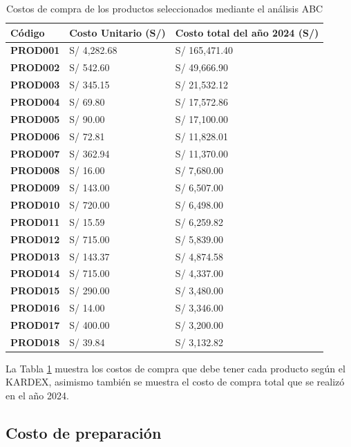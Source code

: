 \newpage
\begin{table}[H]
    \caption{Costos de compra de los productos seleccionados mediante el análisis ABC}
    \begin{tabular}{p{2cm} p{5cm} p{6.5cm}} %
        \hline
        \textbf{Código} & \textbf{Costo Unitario (S/)} & \textbf{Costo total del año 2024 (S/)} \\
        \hline
        \textbf{PROD001} & S/ 4,282.68 & S/ 165,471.40 \\
        \textbf{PROD002} & S/ 542.60 & S/ 49,666.90 \\
        \textbf{PROD003} & S/ 345.15 & S/ 21,532.12 \\
        \textbf{PROD004} & S/ 69.80 & S/ 17,572.86 \\
        \textbf{PROD005} & S/ 90.00 & S/ 17,100.00 \\
        \textbf{PROD006} & S/ 72.81 & S/ 11,828.01 \\
        \textbf{PROD007} & S/ 362.94 & S/ 11,370.00 \\
        \textbf{PROD008} & S/ 16.00 & S/ 7,680.00 \\
        \textbf{PROD009} & S/ 143.00 & S/ 6,507.00 \\
        \textbf{PROD010} & S/ 720.00 & S/ 6,498.00 \\
        \textbf{PROD011} & S/ 15.59 & S/ 6,259.82 \\
        \textbf{PROD012} & S/ 715.00 & S/ 5,839.00 \\
        \textbf{PROD013} & S/ 143.37 & S/ 4,874.58 \\
        \textbf{PROD014} & S/ 715.00 & S/ 4,337.00 \\
        \textbf{PROD015} & S/ 290.00 & S/ 3,480.00 \\
        \textbf{PROD016} & S/ 14.00 & S/ 3,346.00 \\
        \textbf{PROD017} & S/ 400.00 & S/ 3,200.00 \\
        \textbf{PROD018} & S/ 39.84 & S/ 3,132.82 \\
        \hline
    \end{tabular}
    \label{table:GrupoA_Costo_Compra}
\end{table}

La Tabla \ref{table:GrupoA_Costo_Compra} muestra los costos de compra que debe tener cada producto según el KARDEX, asimismo también se muestra el costo de compra total que se realizó en el año 2024.

\subsection{Costo de preparación}

